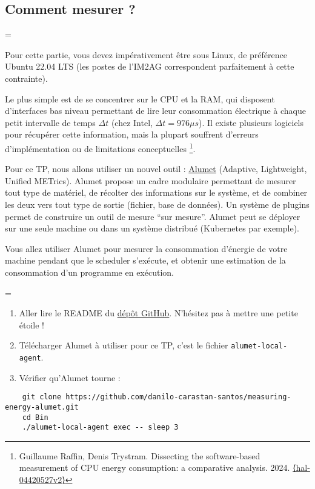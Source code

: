 \documentclass[a4paper,10pt]{article}
\newenvironment{information}
  {\par\begin{mdframed}[linewidth=2pt,linecolor=blue]%
    \begin{list}{}{\leftmargin=1cm
                   \labelwidth=\leftmargin}\item[\emoji{information}]}
  {\end{list}\end{mdframed}\par}
\newenvironment{question}
  {\par\begin{mdframed}[linewidth=2pt,linecolor=red]%
    \begin{list}{}{\leftmargin=1cm
                   \labelwidth=\leftmargin}\item[\emoji{red-question-mark}]}
  {\end{list}\end{mdframed}\par}
\newtheorem{question}{Question}
\begin{document}
\subsection{Comment mesurer ?}

\begin{information}
    Pour cette partie, vous devez impérativement être sous Linux, de préférence
    Ubuntu 22.04 LTS (les postes de l'IM2AG correspondent parfaitement à cette
    contrainte).
\end{information}
  

Le plus simple est de se concentrer sur le CPU et la RAM, qui disposent
d'interfaces bas niveau permettant de lire leur consommation électrique à chaque
petit intervalle de temps $\Delta t$ (chez Intel, $\Delta t = 976 \mu s$). Il
existe plusieurs logiciels pour récupérer cette information, mais la plupart
souffrent d'erreurs d'implémentation ou de limitations conceptuelles
\footnote{Guillaume Raffin, Denis Trystram. Dissecting the software-based
measurement of CPU energy consumption: a comparative analysis. 2024.
\href{https://hal.science/hal-04420527}{⟨hal-04420527v2⟩}}.

Pour ce TP, nous allons utiliser un nouvel outil :
\href{https://alumet.dev/}{Alumet} (Adaptive, Lightweight, Unified METrics).
Alumet propose un cadre modulaire permettant de mesurer tout type de matériel,
de récolter des informations sur le système, et de combiner les deux vers tout
type de sortie (fichier, base de données). Un système de plugins permet de
construire un outil de mesure ``sur mesure''. Alumet peut se déployer sur une
seule machine ou dans un système distribué (Kubernetes par exemple).

Vous allez utiliser Alumet pour mesurer la consommation d'énergie de votre
machine pendant que le scheduler s'exécute, et obtenir une estimation de la
consommation d'un programme en exécution.

\begin{question}    

\begin{enumerate}
    \item  Aller lire le README du \href{https://github.com/alumet-dev/alumet}{dépôt
    GitHub}. N'hésitez pas à mettre une petite étoile  ! 
    \item Télécharger Alumet à utiliser pour ce TP,
    c'est le fichier \texttt{alumet-local-agent}. 
    \item Vérifier qu'Alumet tourne :
\end{enumerate}

\begin{jupytercode}
    \begin{lstlisting}
    git clone https://github.com/danilo-carastan-santos/measuring-energy-alumet.git
    cd Bin
    ./alumet-local-agent exec -- sleep 3
    \end{lstlisting}    
\end{jupytercode}

\end{question}
\end{document}

